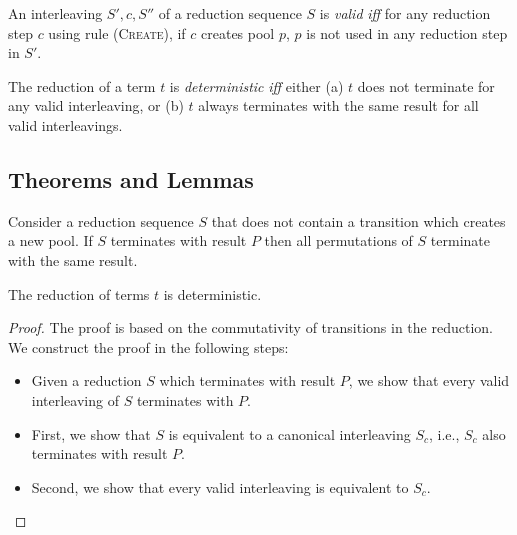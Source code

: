 \documentclass[runningheads,a4paper]{llncs}
\begin{document}
\begin{definition}
An interleaving $S', c, S''$ of a reduction sequence $S$ is \emph{valid}
\emph{iff} for any reduction step $c$ using rule (\textsc{Create}), if
$c$ creates pool $p$, $p$ is not used in any reduction step in $S'$.
\end{definition}

\begin{definition}[Determinism]
The reduction of a term $t$ is \emph{deterministic} \emph{iff} either (a) $t$ does not terminate for any valid interleaving, or (b) $t$ always terminates with the same result for all valid interleavings.
\end{definition}

\subsection{Theorems and Lemmas}

\begin{lemma}
Consider a reduction sequence $S$ that does not contain a transition which creates a new pool.
If $S$ terminates with result $P$ then all permutations of $S$ terminate with the same result.
\end{lemma}

\begin{theorem}[Determinism]
The reduction of terms $t$ is deterministic.
\end{theorem}

\begin{proof}
The proof is based on the commutativity of transitions in the
reduction. We construct the proof in the following steps:
\begin{itemize}
\item Given a reduction $S$ which terminates with result $P$, we show
  that every valid interleaving of $S$ terminates with $P$.
\item First, we show that $S$ is equivalent to a canonical
  interleaving $S_c$, i.e., $S_c$ also terminates with result $P$.
\item Second, we show that every valid interleaving is equivalent to $S_c$.
\end{itemize}
\end{proof}
\end{document}
